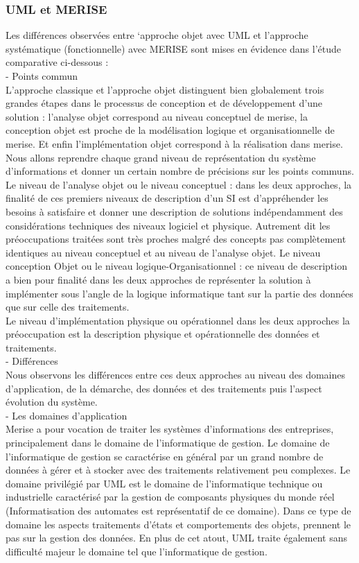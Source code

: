 \subsubsection{UML et MERISE}
	Les différences observées entre ‘approche objet avec UML  et l’approche systématique (fonctionnelle) avec MERISE sont mises en évidence dans l'étude comparative ci-dessous : \\
	- Points commun \\
	L’approche classique et l’approche objet distinguent bien globalement trois grandes étapes dans le processus de conception et de développement d’une solution : l’analyse objet correspond au niveau conceptuel de merise, la conception objet est proche de la modélisation logique et organisationnelle de merise. Et enfin l’implémentation objet correspond à la réalisation dans merise. \\
	Nous allons reprendre chaque grand niveau de représentation du système d’informations  et donner un certain nombre de précisions sur les points communs. \\
Le niveau de l’analyse objet ou le niveau conceptuel : dans les deux approches, la finalité de ces premiers niveaux de description d’un SI est d’appréhender les besoins à satisfaire et donner une description de solutions indépendamment des considérations techniques des niveaux logiciel et physique. Autrement dit les préoccupations traitées sont très proches malgré des concepts pas complètement identiques au niveau conceptuel et au niveau de l’analyse objet. Le niveau conception Objet ou le niveau logique-Organisationnel : ce niveau de description a bien pour finalité dans les deux approches de représenter la solution à implémenter sous l’angle de la logique informatique tant sur la partie des données que sur celle des traitements. \\
Le niveau d'implémentation physique ou opérationnel dans les deux approches la préoccupation est la description physique et opérationnelle des données et traitements. \\
	- Différences \\
	Nous observons les différences entre ces deux approches au niveau des domaines d’application, de la démarche, des données et des traitements puis l’aspect évolution du système. \\
	- Les domaines d’application \\
	Merise a pour vocation de traiter les systèmes d’informations des entreprises, principalement dans le domaine de l’informatique de gestion. Le domaine de l’informatique de gestion se caractérise en général par un grand nombre de données à gérer et à stocker avec des traitements relativement peu complexes. Le domaine privilégié par UML est le domaine de l’informatique technique ou industrielle caractérisé par la gestion de composants physiques du monde réel (Informatisation des automates est représentatif de ce domaine). Dans ce type de domaine les aspects traitements d’états et comportements des objets, prennent le pas sur la gestion des données. En plus de cet atout, UML traite également sans difficulté majeur le domaine tel que l’informatique de gestion. \\
